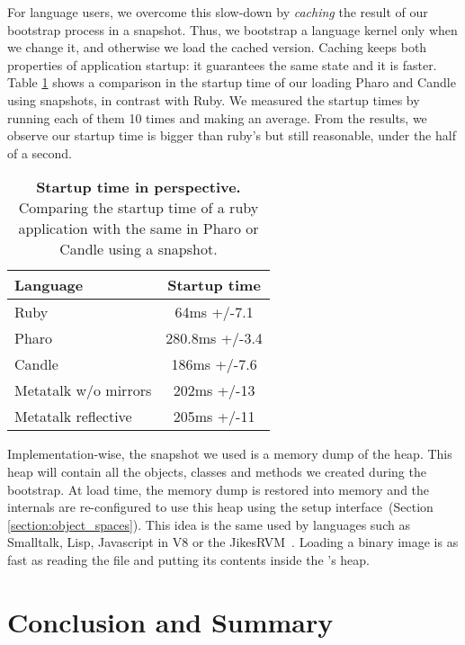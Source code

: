 \begin{description}
For language users, we overcome this slow-down by \emph{caching} the result of our bootstrap process in a snapshot. Thus, we bootstrap a language kernel only when we change it, and otherwise we load the cached version. Caching keeps both properties of application startup: it guarantees the same state and it is faster. Table \ref{tb:startup} shows a comparison in the startup time of our \VM loading Pharo and Candle using snapshots, in contrast with Ruby. We measured the startup times by running each of them 10 times and making an average. From the results, we observe our startup time is bigger than ruby's but still reasonable, under the half of a second.

 \begin{table}[ht]
 \small
 	\centering
 	\begin{tabular}{|l|c|}
			\hline
			\textbf{Language}
 			& \textbf{Startup time}\\
		\hline
		Ruby &  64ms +/-7.1\\\hline
		Pharo & 280.8ms +/-3.4\\\hline
		Candle & 186ms +/-7.6\\\hline
		Metatalk w/o mirrors &202ms +/-13\\\hline
		Metatalk reflective &205ms +/-11\\\hline
 	\end{tabular}
	\vspace*{0.2cm}
 	\caption{\small\textbf{Startup time in perspective.} Comparing the startup time of a ruby application with the same in Pharo or Candle using a snapshot.\label{tb:startup}}
 \end{table}

Implementation-wise, the snapshot we used is a memory dump of the \VM heap. This heap will contain all the objects, classes and methods we created during the bootstrap. At load time, the memory dump is restored into memory and the \VM internals are re-configured to use this heap using the \VM setup interface~(Section \ref{section:object_spaces}). This idea is the same used by languages such as Smalltalk, Lisp, Javascript in V8 or the JikesRVM~\cite{Alpe00a}. Loading a binary image is as fast as reading the file and putting its contents inside the \VM's heap.

\end{description}

\section{Conclusion and Summary}

